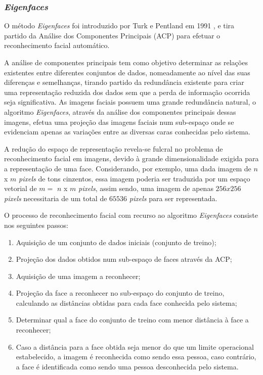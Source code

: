 \subsubsection*{\textit{Eigenfaces}}
O método \textit{Eigenfaces} foi introduzido por Turk e Pentland em 1991 \cite{Turk1991}, e tira partido da Análise dos Componentes Principais (ACP) para efetuar o reconhecimento facial automático.

A análise de componentes principais tem como objetivo determinar as relações existentes entre diferentes conjuntos de dados, nomeadamente ao nível das suas diferenças e semelhanças, tirando partido da redundância existente para criar uma representação reduzida dos dados sem que a perda de informação ocorrida seja significativa. As imagens faciais possuem uma grande redundância natural, o algoritmo \textit{Eigenfaces}, através da análise dos componentes principais dessas imagens, efetua uma projeção das imagens faciais num sub-espaço onde se evidenciam apenas as variações entre as diversas caras conhecidas pelo sistema.

A redução do espaço de representação revela-se fulcral no problema de reconhecimento facial em imagens, devido à grande dimensionalidade exigida para a representação de uma face. Considerando, por exemplo, uma dada imagem de $n$ x $m$ \textit{pixels} de tons cinzentos, essa imagem poderia ser traduzida por um espaço vetorial de $m = $ $n$ x $m$ \textit{pixels}, assim sendo, uma imagem de apenas $256x256$ \textit{pixels} necessitaria de um total de $65536$ \textit{pixels} para ser representada.

O processo de reconhecimento facial com recurso ao algoritmo \textit{Eigenfaces} consiste nos seguintes passos:
\begin{enumerate}
\item Aquisição de um conjunto de dados iniciais (conjunto de treino);
\item Projeção dos dados obtidos num sub-espaço de faces através da ACP;
\item Aquisição de uma imagem a reconhecer;
\item Projeção da face a reconhecer no sub-espaço do conjunto de treino, calculando as distâncias obtidas para cada face conhecida pelo sistema;
\item Determinar qual a face do conjunto de treino com menor distância à face a reconhecer;
\item Caso a distância para a face obtida seja menor do que um limite operacional estabelecido, a imagem é reconhecida como sendo essa pessoa, caso contrário, a face é identificada como sendo uma pessoa desconhecida pelo sistema.
\end{enumerate}

